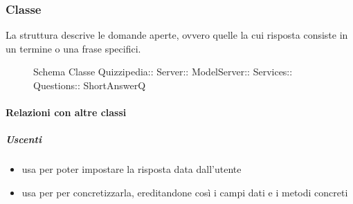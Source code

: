 \subsubsection{Classe }
La struttura descrive le domande aperte, ovvero quelle la cui risposta consiste in un termine o una frase specifici.
\begin{figure}[H]
\centering
\noindent{}
\caption[Schema Classe ShortAnswerQ]{Schema Classe Quizzipedia:: Server:: ModelServer:: Services:: Questions:: ShortAnswerQ}
\end{figure}
\paragraph{Relazioni con altre classi}
\subparagraph{Uscenti}
\begin{itemize}
\item usa  per poter impostare la risposta data dall'utente
\item usa  per per concretizzarla, ereditandone così i campi dati e i metodi concreti
\end{itemize}
